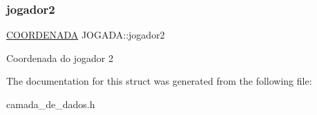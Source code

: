 \subsubsection{\texorpdfstring{jogador2}{jogador2}}
{\footnotesize\ttfamily \hyperlink{structCOORDENADA}{C\+O\+O\+R\+D\+E\+N\+A\+DA} J\+O\+G\+A\+D\+A\+::jogador2}

Coordenada do jogador 2 

The documentation for this struct was generated from the following file\+:\begin{DoxyCompactItemize}
\item 
camada\+\_\+de\+\_\+dados.\+h\end{DoxyCompactItemize}
